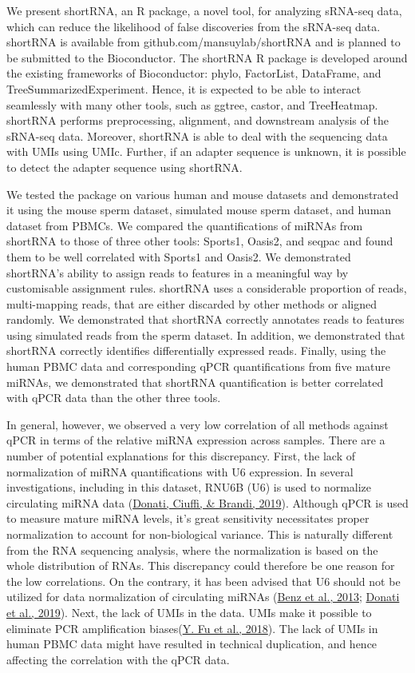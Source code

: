 \documentclass[12pt,twoside]{reedthesis}
\begin{document}
We present shortRNA, an R package, a novel tool, for analyzing sRNA-seq
data, which can reduce the likelihood of false discoveries from the
sRNA-seq data. shortRNA is available from github.com/mansuylab/shortRNA
and is planned to be submitted to the Bioconductor. The shortRNA R
package is developed around the existing frameworks of Bioconductor:
phylo, FactorList, DataFrame, and TreeSummarizedExperiment. Hence, it is
expected to be able to interact seamlessly with many other tools, such
as ggtree, castor, and TreeHeatmap. shortRNA performs preprocessing,
alignment, and downstream analysis of the sRNA-seq data. Moreover,
shortRNA is able to deal with the sequencing data with UMIs using UMIc.
Further, if an adapter sequence is unknown, it is possible to detect the
adapter sequence using shortRNA.

We tested the package on various human and mouse datasets and
demonstrated it using the mouse sperm dataset, simulated mouse sperm
dataset, and human dataset from PBMCs. We compared the quantifications
of miRNAs from shortRNA to those of three other tools: Sports1, Oasis2,
and seqpac and found them to be well correlated with Sports1 and Oasis2.
We demonstrated shortRNA's ability to assign reads to features in a
meaningful way by customisable assignment rules. shortRNA uses a
considerable proportion of reads, multi-mapping reads, that are either
discarded by other methods or aligned randomly. We demonstrated that
shortRNA correctly annotates reads to features using simulated reads
from the sperm dataset. In addition, we demonstrated that shortRNA
correctly identifies differentially expressed reads. Finally, using the
human PBMC data and corresponding qPCR quantifications from five mature
miRNAs, we demonstrated that shortRNA quantification is better
correlated with qPCR data than the other three tools.

In general, however, we observed a very low correlation of all methods
against qPCR in terms of the relative miRNA expression across samples.
There are a number of potential explanations for this discrepancy.
First, the lack of normalization of miRNA quantifications with U6
expression. In several investigations, including in this dataset, RNU6B
(U6) is used to normalize circulating miRNA data (\protect\hyperlink{ref-donati2019}{Donati, Ciuffi, \& Brandi, 2019}). Although
qPCR is used to measure mature miRNA levels, it's great sensitivity
necessitates proper normalization to account for non-biological
variance. This is naturally different from the RNA sequencing analysis,
where the normalization is based on the whole distribution of RNAs. This
discrepancy could therefore be one reason for the low correlations. On
the contrary, it has been advised that U6 should not be utilized for
data normalization of circulating miRNAs (\protect\hyperlink{ref-benz2013}{Benz et al., 2013}; \protect\hyperlink{ref-donati2019}{Donati et al., 2019}). Next,
the lack of UMIs in the data. UMIs make it possible to eliminate PCR
amplification biases(\protect\hyperlink{ref-fu2018}{Y. Fu et al., 2018}). The lack of UMIs in human PBMC data might
have resulted in technical duplication, and hence affecting the
correlation with the qPCR data.
\end{document}
